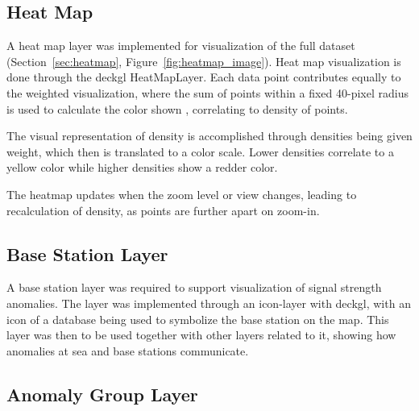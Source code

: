 
\subsection{Heat Map}
\label{sec:Heat_Map_method}

A heat map layer was implemented for visualization of the full dataset (Section~\ref{sec:heatmap}, Figure~\ref{fig:heatmap_image}). Heat map visualization is done through the \gls{deckgl} HeatMapLayer. Each data point contributes equally to the weighted visualization, where the sum of points within a fixed 40-pixel radius is used to calculate the color shown \parencite{deckgl_official_site},
correlating to density of points. 

The visual representation of density is accomplished through densities being given weight, which then is translated to a color scale. Lower densities correlate to a yellow color while higher densities show a redder color. 

The heatmap updates when the zoom level or view changes, leading to recalculation of density, as points are further apart on zoom-in. 


\subsection{Base Station Layer}
\label{sec:base_station}

A base station layer was required to support visualization of signal strength anomalies. The layer was implemented through an icon-layer with \gls{deckgl}, with an icon of a database being used to symbolize the base station on the map. This layer was then to be used together with other layers related to it, showing how anomalies at sea and base stations communicate.


\subsection{Anomaly Group Layer}

